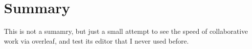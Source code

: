 \documentclass[11pt,a4paper,twoside,titlepage,openany]{book}
\makeatletter
\newcommand\ackname{Acknowledgements}
\newenvironment{acknowledgements}{
  \newpage
  \thispagestyle{empty}
  \null\vfil
  \@beginparpenalty\@lowpenalty
  \begin{center}
    \@endparpenalty\@M
  \end{center}}
{\par\vfil\null\endtitlepage}
\makeatother
\begin{document}
\tableofcontents

\chapter*{Summary}
This is not a sumamry, but just a small attempt to see the speed of collaborative work via overleaf, and test its editor that I never used before. 


\end{document}
